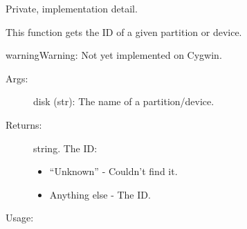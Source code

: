 \documentclass[letterpaper,10pt,english]{sphinxmanual}
\begin{document}
\begin{fulllineitems}
\label{\detokenize{cygwin:getdevinfo.cygwin.get_id}}
Private, implementation detail.

This function gets the ID of a given partition or device.

\begin{sphinxadmonition}{warning}{Warning:}
Not yet implemented on Cygwin.
\end{sphinxadmonition}
\begin{description}
\item[{Args:}] \leavevmode
disk (str):   The name of a partition/device.

\item[{Returns:}] \leavevmode
string. The ID:
\begin{itemize}
\item {} 
“Unknown”     - Couldn’t find it.

\item {} 
Anything else - The ID.

\end{itemize}

\end{description}

Usage:

\begin{sphinxVerbatim}[commandchars=\\\{\}]
  
\end{sphinxVerbatim}

\end{fulllineitems}

\end{document}
